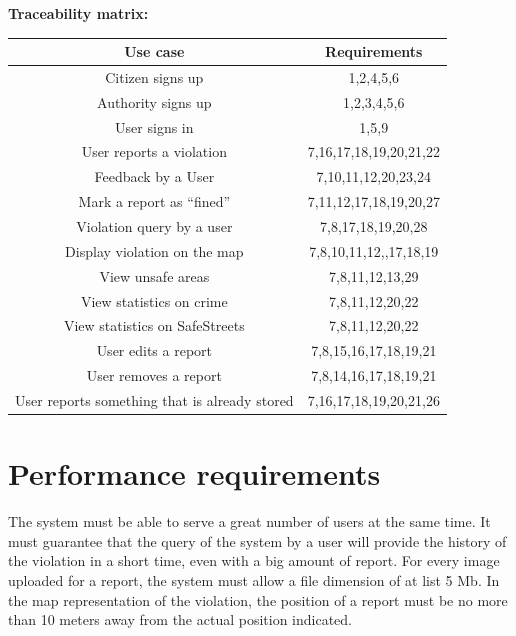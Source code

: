 \documentclass[../RASD.tex]{subfiles}
\begin{document}
                \textbf{Traceability matrix:}
                \begin{center}
                    \begin{tabular}{ ||c||c|| }

                        \hline
                        \textbf{Use case} & \textbf{Requirements}  \\ \hline
                        [\textbf{1}] Citizen signs up & 1,2,4,5,6 \\ \hline
                        [\textbf{2}] Authority signs up & 1,2,3,4,5,6\\ \hline
                        [\textbf{3}] User signs in & 1,5,9\\ \hline
                        [\textbf{4}] User reports a violation & 7,16,17,18,19,20,21,22\\ \hline
                        [\textbf{5}] Feedback by a User & 7,10,11,12,20,23,24\\ \hline
                        [\textbf{6}] Mark a report as “fined” & 7,11,12,17,18,19,20,27\\ \hline
                        [\textbf{7}] Violation query by a user & 7,8,17,18,19,20,28\\ \hline
                        [\textbf{8}] Display violation on the map & 7,8,10,11,12,,17,18,19\\ \hline
                        [\textbf{9}] View unsafe areas & 7,8,11,12,13,29\\ \hline
                        [\textbf{10}] View statistics on crime & 7,8,11,12,20,22\\ \hline
                        [\textbf{11}] View statistics on SafeStreets & 7,8,11,12,20,22\\ \hline
                        [\textbf{12}] User edits a report & 7,8,15,16,17,18,19,21\\ \hline
                        [\textbf{13}] User removes a report & 7,8,14,16,17,18,19,21\\ \hline
                        [\textbf{14}] User reports something that is already stored & 7,16,17,18,19,20,21,26\\ \hline
                    \end{tabular}
                \end{center}
    \newpage
        \section{Performance requirements}\label{sec:performance-requirements}
        The system must be able to serve a great number of users at the same time. It must guarantee that the query of the system by a user will provide the history of the violation in a short time, even with a big amount of report. For every image uploaded for a report, the system must allow a file dimension of at list 5 Mb. In the map representation of the violation, the position of a report must be no more than 10 meters away from the actual position indicated.
\end{document}
